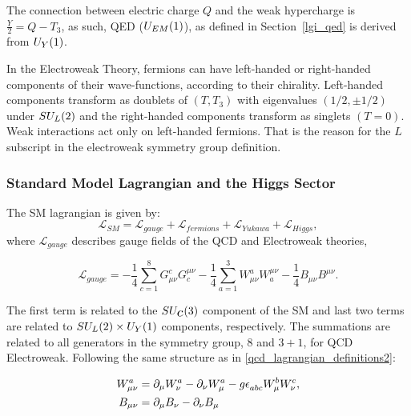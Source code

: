 The connection between electric charge $Q$ and the weak hypercharge is $\frac{Y}{2} = Q - T_3$, as such, QED ($U_{\scaleto{EM}{5pt}}(1)$), as defined in Section~\ref{lgi_qed} is derived from $U_{\scaleto{Y}{5pt}}(1)$.

In the Electroweak Theory, fermions can have left-handed or right-handed components of their wave-functions, according to their chirality. Left-handed components transform as doublets of $(T, T_3)$ with eigenvalues $(1/2, \pm1/2)$ under $SU_{\scaleto{L}{5pt}}(2)$ and the right-handed components transform as singlets $(T=0)$. Weak interactions act only on left-handed fermions. That is the reason for the $L$ subscript in the electroweak symmetry group definition.

\subsubsection{Standard Model Lagrangian and the Higgs Sector}

The SM lagrangian is given by:
\begin{equation}
        \mathcal{L}_{SM} =  \mathcal{L}_{gauge} + \mathcal{L}_{fermions} + \mathcal{L}_{Yukawa} + \mathcal{L}_{Higgs},
\label{sm_lagrangian}
\end{equation}
where $\mathcal{L}_{gauge}$ describes gauge fields of the QCD and Electroweak theories,

\begin{equation}
    \mathcal{L}_{gauge} =  -\frac{1}{4}\sum_{c = 1}^{8}G_{\mu\nu}^c G^{\mu\nu}_c -\frac{1}{4}\sum_{a = 1}^{3}W_{\mu\nu}^a W^{\mu\nu}_a  -\frac{1}{4}B_{\mu\nu} B^{\mu\nu} .
\label{sm_lagrangian_gauge}
\end{equation} 

The first term is related to the $SU_{\scaleto{c}{5pt}}(3)$ component of the SM and last two terms are related to $SU_{\scaleto{L}{5pt}}(2) \times U_{\scaleto{Y}{5pt}}(1)$ components, respectively. The summations are related to all generators in the symmetry group, $8$ and $3 + 1$, for QCD Electroweak.  Following the same structure as in \ref{qcd_lagrangian_definitions2}:

\begin{equation}
    \begin{split}
        W_{\mu\nu}^a &= \partial_\mu W_\nu^a - \partial_\nu W_\mu^a - g \levicivita{_{abc}} W_\mu^b W_\nu^c,  \\
        B_{\mu\nu} &= \partial_\mu B_\nu - \partial_\nu B_\mu
    \end{split}
\label{electroweak_field}
\end{equation}


